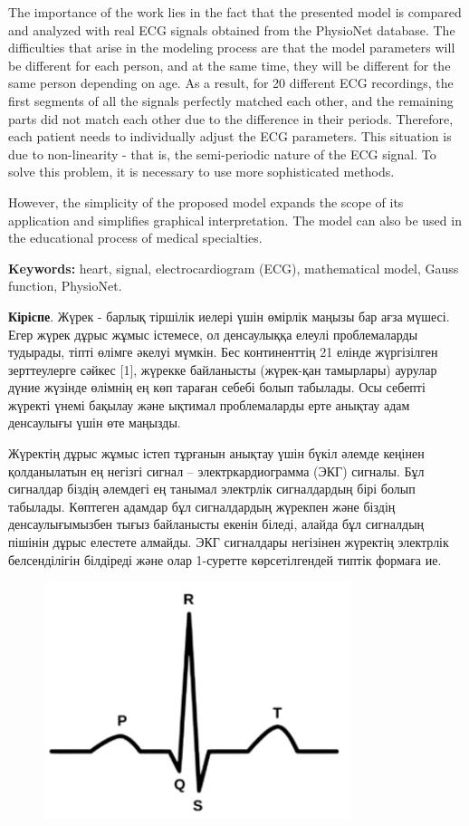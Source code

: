 {The importance of the work lies in the fact that the presented model is
compared and analyzed with real ECG signals obtained from the PhysioNet
database. The difficulties that arise in the modeling process are that
the model parameters will be different for each person, and at the same
time, they will be different for the same person depending on age. As a
result, for 20 different ECG recordings, the first segments of all the
signals perfectly matched each other, and the remaining parts did not
match each other due to the difference in their periods. Therefore, each
patient needs to individually adjust the ECG parameters. This situation
is due to non-linearity - that is, the semi-periodic nature of the ECG
signal. To solve this problem, it is necessary to use more sophisticated
methods.

However, the simplicity of the proposed model expands the scope of its
application and simplifies graphical interpretation. The model can also
be used in the educational process of medical specialties.

{\bfseries Keywords:} heart, signal, electrocardiogram (ECG), mathematical
model, Gauss function, PhysioNet.

{\bfseries Кіріспе}. Жүрек - барлық тіршілік иелері үшін өмірлік маңызы бар
ағза мүшесі. Егер жүрек дұрыс жұмыс істемесе, ол денсаулыққа елеулі
проблемаларды тудырады, тіпті өлімге әкелуі мүмкін. Бес континенттің 21
елінде жүргізілген зерттеулерге сәйкес {[}1{]}, жүрекке байланысты
(жүрек-қан тамырлары) аурулар дүние жүзінде өлімнің ең көп тараған
себебі болып табылады. Осы себепті жүректі үнемі бақылау және ықтимал
проблемаларды ерте анықтау адам денсаулығы үшін өте маңызды.

Жүректің дұрыс жұмыс істеп тұрғанын анықтау үшін бүкіл әлемде кеңінен
қолданылатын ең негізгі сигнал -- электркардиограмма (ЭКГ) сигналы. Бұл
сигналдар біздің әлемдегі ең танымал электрлік сигналдардың бірі болып
табылады. Көптеген адамдар бұл сигналдардың жүрекпен және біздің
денсаулығымызбен тығыз байланысты екенін біледі, алайда бұл сигналдың
пішінін дұрыс елестете алмайды. ЭКГ сигналдары негізінен жүректің
электрлік белсенділігін білдіреді және олар 1-суретте көрсетілгендей
типтік формаға ие.

\begin{figure}[H]
	\centering
	\includegraphics[width=0.8\textwidth]{media/ict/image40}
	\caption*{}
\end{figure}


}
